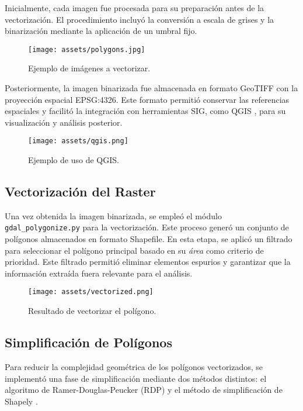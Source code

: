 \documentclass[twocolumn, fontsize=10pt]{article}
\begin{document}
Inicialmente, cada imagen fue procesada para su preparación antes de la vectorización. El procedimiento incluyó la conversión a escala de grises y la binarización mediante la aplicación de un umbral fijo. \\

\begin{figure}[H]
    \centering
    \texttt{[image: assets/polygons.jpg]}
    \caption{Ejemplo de imágenes a vectorizar.}
    \label{fig:polygons}
\end{figure}


Posteriormente, la imagen binarizada fue almacenada en formato GeoTIFF con la proyección espacial EPSG:4326. Este formato permitió conservar las referencias espaciales y facilitó la integración con herramientas SIG, como QGIS \cite{qgis}, para su visualización y análisis posterior.

\begin{figure}[H]
    \centering
    \texttt{[image: assets/qgis.png]}
    \caption{Ejemplo de uso de QGIS.}
    \label{fig:qgis}
\end{figure}

\subsection{Vectorización del Raster}

Una vez obtenida la imagen binarizada, se empleó el módulo \texttt{gdal\_polygonize.py} para la vectorización. Este proceso generó un conjunto de polígonos almacenados en formato Shapefile. En esta etapa, se aplicó un filtrado para seleccionar el polígono principal basado en su \textit{área} como criterio de prioridad. Este filtrado permitió eliminar elementos espurios y garantizar que la información extraída fuera relevante para el análisis.

\begin{figure}[H]
    \centering
    \texttt{[image: assets/vectorized.png]}
    \caption{Resultado de vectorizar el polígono.}
    \label{fig:vectorized}
\end{figure}

\subsection{Simplificación de Polígonos}

Para reducir la complejidad geométrica de los polígonos vectorizados, se implementó una fase de simplificación mediante dos métodos distintos: el algoritmo de Ramer-Douglas-Peucker (RDP) \cite{rdp} y el método de simplificación de Shapely \cite{shapely}. 
\end{document}
